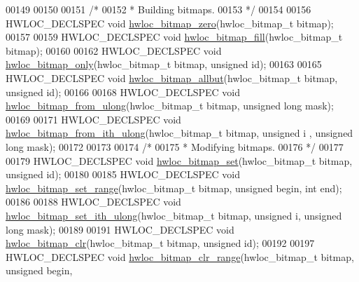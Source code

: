 \begin{DoxyCode}
00149 
00150 
00151 \textcolor{comment}{/*}
00152 \textcolor{comment}{ * Building bitmaps.}
00153 \textcolor{comment}{ */}
00154 
00156 HWLOC\_DECLSPEC \textcolor{keywordtype}{void} \hyperlink{a00065_ga6c540b9fe63b8223b6aba46d56dd63b8}{hwloc_bitmap_zero}(hwloc\_bitmap\_t bitmap);
00157 
00159 HWLOC\_DECLSPEC \textcolor{keywordtype}{void} \hyperlink{a00065_ga52456f7ef79d68e610cb65e3f7ffafad}{hwloc_bitmap_fill}(hwloc\_bitmap\_t bitmap);
00160 
00162 HWLOC\_DECLSPEC \textcolor{keywordtype}{void} \hyperlink{a00065_ga8ea10f5ebaadb8418f28f953d6106190}{hwloc_bitmap_only}(hwloc\_bitmap\_t bitmap, \textcolor{keywordtype}{unsigned} \textcolor{keywordtype}{id});
00163 
00165 HWLOC\_DECLSPEC \textcolor{keywordtype}{void} \hyperlink{a00065_ga88204c1c313aa067da10241b5886a166}{hwloc_bitmap_allbut}(hwloc\_bitmap\_t bitmap, \textcolor{keywordtype}{unsigned} \textcolor{keywordtype}{id});
00166 
00168 HWLOC\_DECLSPEC \textcolor{keywordtype}{void} \hyperlink{a00065_ga02eae57cff32b6aa55044e6609ae7d73}{hwloc_bitmap_from_ulong}(hwloc\_bitmap\_t bitmap, \textcolor{keywordtype}{unsigned} \textcolor{keywordtype}{long} 
      mask);
00169 
00171 HWLOC\_DECLSPEC \textcolor{keywordtype}{void} \hyperlink{a00065_ga3c44c943cb3a3e4577b32d924e4f36f2}{hwloc_bitmap_from_ith_ulong}(hwloc\_bitmap\_t bitmap, \textcolor{keywordtype}{unsigned} i
      , \textcolor{keywordtype}{unsigned} \textcolor{keywordtype}{long} mask);
00172 
00173 
00174 \textcolor{comment}{/*}
00175 \textcolor{comment}{ * Modifying bitmaps.}
00176 \textcolor{comment}{ */}
00177 
00179 HWLOC\_DECLSPEC \textcolor{keywordtype}{void} \hyperlink{a00065_ga497556af0cc34f109ae0277999c074d3}{hwloc_bitmap_set}(hwloc\_bitmap\_t bitmap, \textcolor{keywordtype}{unsigned} \textcolor{keywordtype}{id});
00180 
00185 HWLOC\_DECLSPEC \textcolor{keywordtype}{void} \hyperlink{a00065_ga9d4f8fc40f552a76c943b5b773ac17d6}{hwloc_bitmap_set_range}(hwloc\_bitmap\_t bitmap, \textcolor{keywordtype}{unsigned} begin,
       \textcolor{keywordtype}{int} end);
00186 
00188 HWLOC\_DECLSPEC \textcolor{keywordtype}{void} \hyperlink{a00065_ga56027d6b141a3da441925e6e999de1c1}{hwloc_bitmap_set_ith_ulong}(hwloc\_bitmap\_t bitmap, \textcolor{keywordtype}{unsigned} i,
       \textcolor{keywordtype}{unsigned} \textcolor{keywordtype}{long} mask);
00189 
00191 HWLOC\_DECLSPEC \textcolor{keywordtype}{void} \hyperlink{a00065_ga54e89b87ba5f5c18323f16690e0e5730}{hwloc_bitmap_clr}(hwloc\_bitmap\_t bitmap, \textcolor{keywordtype}{unsigned} \textcolor{keywordtype}{id});
00192 
00197 HWLOC\_DECLSPEC \textcolor{keywordtype}{void} \hyperlink{a00065_gac27bd46fd5b387def6b40712b7ee2796}{hwloc_bitmap_clr_range}(hwloc\_bitmap\_t bitmap, \textcolor{keywordtype}{unsigned} begin,

\end{DoxyCode}

